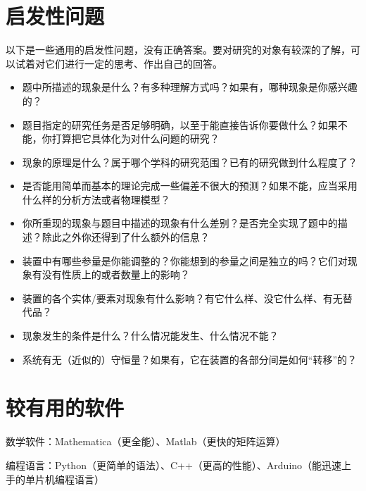 \documentclass[a4paper,10pt,english]{sphinxmanual}
\begin{document}
\section{启发性问题}
\label{\detokenize{8. Appendix:id32}}
以下是一些通用的启发性问题，没有正确答案。要对研究的对象有较深的了解，可以试着对它们进行一定的思考、作出自己的回答。
\begin{itemize}
\item {} 
题中所描述的现象是什么？有多种理解方式吗？如果有，哪种现象是你感兴趣的？

\item {} 
题目指定的研究任务是否足够明确，以至于能直接告诉你要做什么？如果不能，你打算把它具体化为对什么问题的研究？

\item {} 
现象的原理是什么？属于哪个学科的研究范围？已有的研究做到什么程度了？

\item {} 
是否能用简单而基本的理论完成一些偏差不很大的预测？如果不能，应当采用什么样的分析方法或者物理模型？

\item {} 
你所重现的现象与题目中描述的现象有什么差别？是否完全实现了题中的描述？除此之外你还得到了什么额外的信息？

\item {} 
装置中有哪些参量是你能调整的？你能想到的参量之间是独立的吗？它们对现象有没有性质上的或者数量上的影响？

\item {} 
装置的各个实体/要素对现象有什么影响？有它什么样、没它什么样、有无替代品？

\item {} 
现象发生的条件是什么？什么情况能发生、什么情况不能？

\item {} 
系统有无（近似的）守恒量？如果有，它在装置的各部分间是如何“转移”的？

\end{itemize}



\section{较有用的软件}
\label{\detokenize{8. Appendix:id33}}
数学软件：Mathematica（更全能）、Matlab（更快的矩阵运算）

编程语言：Python（更简单的语法）、C++（更高的性能）、Arduino（能迅速上手的单片机编程语言）
\end{document}
